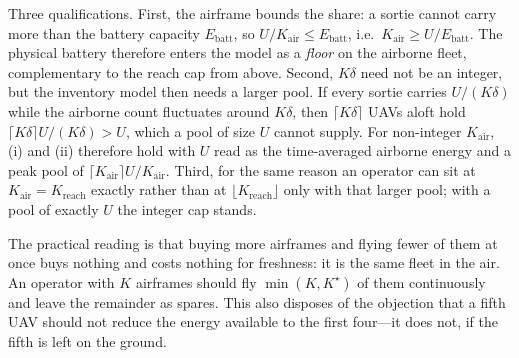 \documentclass[journal,outdir=./]{IEEEtran}
\newcommand{\Kr}{K_{\mathrm{reach}}}
\begin{document}
Three qualifications. First, the airframe bounds the share: a sortie cannot carry more than the battery capacity $E_{\mathrm{batt}}$, so $U/K_{\mathrm{air}}\le E_{\mathrm{batt}}$, i.e.\ $K_{\mathrm{air}}\ge U/E_{\mathrm{batt}}$. The physical battery therefore enters the model as a \emph{floor} on the airborne fleet, complementary to the reach cap from above. Second, $K\delta$ need not be an integer, but the inventory model then needs a larger pool. If every sortie carries $U/(K\delta)$ while the airborne count fluctuates around $K\delta$, then $\lceil K\delta\rceil$ UAVs aloft hold $\lceil K\delta\rceil U/(K\delta)>U$, which a pool of size $U$ cannot supply. For non-integer $K_{\mathrm{air}}$, (i) and (ii) therefore hold with $U$ read as the time-averaged airborne energy and a peak pool of $\lceil K_{\mathrm{air}}\rceil U/K_{\mathrm{air}}$. Third, for the same reason an operator can sit at $K_{\mathrm{air}}=\Kr$ exactly rather than at $\lfloor\Kr\rfloor$ only with that larger pool; with a pool of exactly $U$ the integer cap stands.

The practical reading is that buying more airframes and flying fewer of them at once buys nothing and costs nothing for freshness: it is the same fleet in the air. An operator with $K$ airframes should fly $\min(K,K^\star)$ of them continuously and leave the remainder as spares. This also disposes of the objection that a fifth UAV should not reduce the energy available to the first four---it does not, if the fifth is left on the ground.
\end{document}
